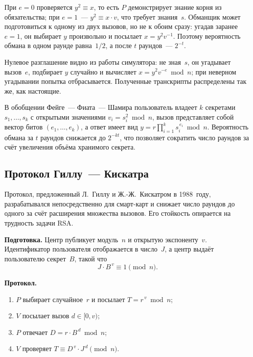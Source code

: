 \documentclass[14pt,a4paper]{extarticle}
\begin{document}
При $e = 0$ проверяется $y^2 \equiv x$, то есть $P$ демонстрирует знание корня из
обязательства; при $e = 1$~--- $y^2 \equiv x \cdot v$, что требует знания~$s$. Обманщик
может подготовиться к одному из двух вызовов, но не к обоим сразу: угадав заранее $e=1$,
он выбирает $y$ произвольно и посылает $x = y^2 v^{-1}$. Поэтому вероятность обмана в
одном раунде равна~$1/2$, а после $t$ раундов~--- $2^{-t}$.

Нулевое разглашение видно из работы симулятора: не зная~$s$, он угадывает вызов~$e$,
подбирает $y$ случайно и вычисляет $x = y^2 v^{-e} \bmod n$; при неверном угадывании
попытка отбрасывается. Полученные транскрипты распределены так же, как настоящие.

В обобщении Фейге~--- Фиата~--- Шамира пользователь владеет $k$ секретами
$s_1, \dots, s_k$ с открытыми значениями $v_i = s_i^2 \bmod n$, вызов представляет
собой вектор битов $(e_1, \dots, e_k)$, а ответ имеет вид
$y = r \prod_{i=1}^{k} s_i^{\,e_i} \bmod n$. Вероятность обмана за $t$ раундов
снижается до $2^{-kt}$, что позволяет сократить число раундов за счёт увеличения
объёма хранимого секрета.

\subsection{Протокол Гиллу~--- Кискатра}

Протокол, предложенный Л.~Гиллу и Ж.-Ж.~Кискатром в 1988~году, разрабатывался
непосредственно для смарт-карт и снижает число раундов до одного за счёт расширения
множества вызовов. Его стойкость опирается на трудность задачи RSA.

\textbf{Подготовка.} Центр публикует модуль~$n$ и открытую экспоненту~$v$. Идентификатор
пользователя отображается в число~$J$, а центр выдаёт пользователю секрет~$B$, такой что
\begin{equation}
J \cdot B^{\,v} \equiv 1 \pmod n .
\end{equation}

\textbf{Протокол.}
\begin{enumerate}
\item $P$ выбирает случайное~$r$ и посылает $T = r^{\,v} \bmod n$;
\item $V$ посылает вызов $d \in [0, v)$;
\item $P$ отвечает $D = r \cdot B^{\,d} \bmod n$;
\item $V$ проверяет $T \equiv D^{\,v} \cdot J^{\,d} \pmod n$.
\end{enumerate}
\end{document}
